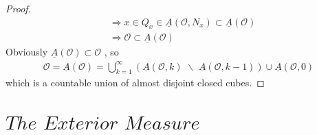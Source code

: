 \begin{thm}
\begin{proof}
\begin{align}
				&\Rightarrow x \in Q_x \in \underline{A}(\mathcal{O} , N_x) \subset \underline{A}(\mathcal{O}) \\
				&\Rightarrow \mathcal{O} \subset \underline{A}(\mathcal{O})
			\end{align}
			Obviously $\underline{A}(\mathcal{O}) \subset \mathcal{O}$ , so 
			\begin{align}
				\mathcal{O} = \underline{A}(\mathcal{O}) = \bigcup_{k = 1}^{\infty}{\left( \underline{A}(\mathcal{O} , k) \,\, \backslash \,\, \underline{A}(\mathcal{O} , k - 1) \right)} \cup \underline{A}(\mathcal{O} , 0)
			\end{align}
			which is a countable union of almost disjoint closed cubes.
		\end{proof}
	\end{thm}

\newpage
\section{$The \,\, Exterior \,\, Measure$}
